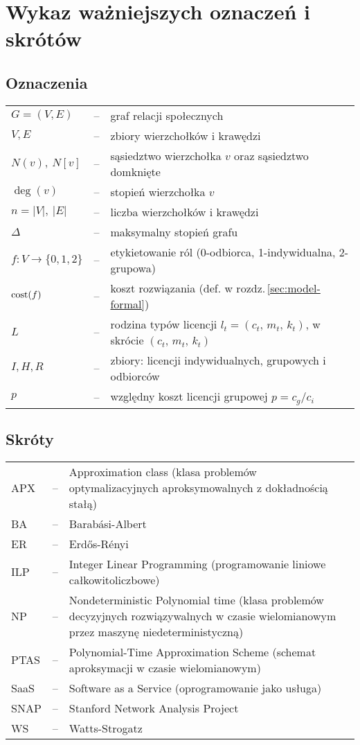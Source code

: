 \chapter*{Wykaz ważniejszych oznaczeń i skrótów}

\section*{Oznaczenia}

\begin{tabular}{@{} l l p{} @{}}
    $G=(V,E)$    & -- & graf relacji społecznych \\
    $V,E$        & -- & zbiory wierzchołków i krawędzi \\
    $N(v),\ N[v]$ & -- & sąsiedztwo wierzchołka $v$ oraz sąsiedztwo domknięte \\
    $\deg(v)$    & -- & stopień wierzchołka $v$ \\
    $n=|V|,\ |E|$ & -- & liczba wierzchołków i krawędzi \\
    $\Delta$     & -- & maksymalny stopień grafu \\
    $f:V\to\{0,1,2\}$ & -- & etykietowanie ról (0-odbiorca, 1-indywidualna, 2-grupowa) \\
    $\operatorname{cost}(f)$   & -- & koszt rozwiązania (def. w rozdz.\,\ref{sec:model-formal}) \\
    $L$ & -- & rodzina typów licencji $l_t=(c_t,\,m_t,\,k_t)$, w skrócie $(c_t,\,m_t,\,k_t)$ \\
    $I,H,R$      & -- & zbiory: licencji indywidualnych, grupowych i odbiorców \\
    $p$          & -- & względny koszt licencji grupowej $p=c_g/c_i$ \\
\end{tabular}

\section*{Skróty}

\begin{tabular}{@{} l l p{} @{}}
    APX  & -- & Approximation class (klasa problemów optymalizacyjnych aproksymowalnych z dokładnością stałą) \\
    BA   & -- & Barabási-Albert \\
    ER   & -- & Erdős-Rényi \\
    ILP  & -- & Integer Linear Programming (programowanie liniowe całkowitoliczbowe) \\
    NP   & -- & Nondeterministic Polynomial time (klasa problemów decyzyjnych rozwiązywalnych w czasie wielomianowym przez maszynę niedeterministyczną) \\
    PTAS & -- & Polynomial-Time Approximation Scheme (schemat aproksymacji w czasie wielomianowym) \\
    SaaS & -- & Software as a Service (oprogramowanie jako usługa) \\
    SNAP & -- & Stanford Network Analysis Project \\
    WS   & -- & Watts-Strogatz \\
\end{tabular}
